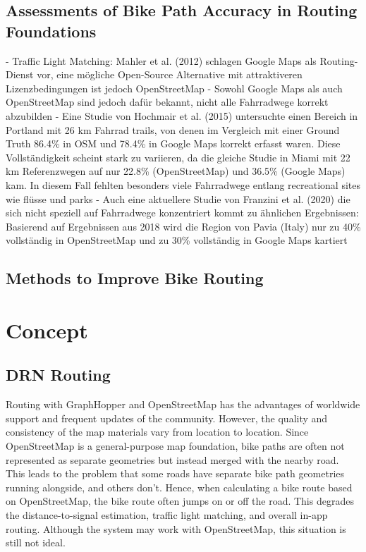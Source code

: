 \subsection{Assessments of Bike Path Accuracy in Routing Foundations}

- Traffic Light Matching: Mahler et al. (2012) \cite{mahler_reducing_2012} schlagen Google Maps als Routing-Dienst vor, eine mögliche Open-Source Alternative mit attraktiveren Lizenzbedingungen ist jedoch OpenStreetMap
- Sowohl Google Maps als auch OpenStreetMap sind jedoch dafür bekannt, nicht alle Fahrradwege korrekt abzubilden
- Eine Studie von Hochmair et al. (2015) \cite{hochmair_assessing_2015} untersuchte einen Bereich in Portland mit 26 km Fahrrad trails, von denen im Vergleich mit einer Ground Truth 86.4\% in OSM und 78.4\% in Google Maps korrekt erfasst waren. Diese Vollständigkeit scheint stark zu variieren, da die gleiche Studie in Miami mit 22 km Referenzwegen auf nur 22.8\% (OpenStreetMap) und 36.5\% (Google Maps) kam. In diesem Fall fehlten besonders viele Fahrradwege entlang recreational sites wie flüsse und parks
- Auch eine aktuellere Studie von Franzini et al. (2020) \cite{franzini_assessment_2020} die sich nicht speziell auf Fahrradwege konzentriert kommt zu ähnlichen Ergebnissen: Basierend auf Ergebnissen aus 2018 wird die Region von Pavia (Italy) nur zu 40\% vollständig in OpenStreetMap und zu 30\% vollständig in Google Maps kartiert

\subsection{Methods to Improve Bike Routing}

\section{Concept}

\subsection{DRN Routing}

Routing with GraphHopper and OpenStreetMap has the advantages of worldwide support and frequent updates of the community. However, the quality and consistency of the map materials vary from location to location. Since OpenStreetMap is a general-purpose map foundation, bike paths are often not represented as separate geometries but instead merged with the nearby road. This leads to the problem that some roads have separate bike path geometries running alongside, and others don't. Hence, when calculating a bike route based on OpenStreetMap, the bike route often jumps on or off the road. This degrades the distance-to-signal estimation, traffic light matching, and overall in-app routing. Although the system may work with OpenStreetMap, this situation is still not ideal.

